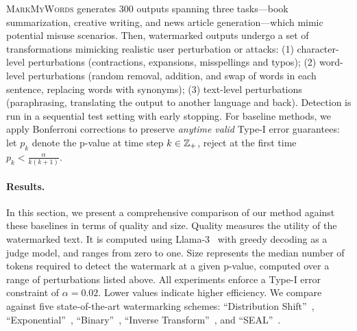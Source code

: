 \textsc{MarkMyWords} generates 300 outputs spanning three tasks---book summarization, creative writing, and news article generation---which mimic potential misuse scenarios. 
Then, watermarked outputs undergo a set of transformations mimicking realistic user perturbation or attacks: (1) character-level perturbations (contractions, expansions, misspellings and typos); (2) word-level perturbations (random removal, addition, and swap of words in each sentence, replacing words with synonyms); (3) text-level perturbations (paraphrasing, translating the output to another language and back).
Detection is run in a sequential test setting with early stopping. For baseline methods, we apply Bonferroni corrections to preserve \emph{anytime valid} Type-I error guarantees: let $p_k$ denote the p-value at time step $k \in \mathbb{Z}_+$, reject at the first time ${p_k} < \frac{\alpha}{k(k+1)}$.

\paragraph{Results.}

In this section, we present a comprehensive comparison of our method against these baselines in terms of quality and size. 
Quality measures the utility of the watermarked text. It is computed using Llama-3~\citep{dubey2024llama} with greedy decoding as a judge model, and ranges from zero to one.
{Size} represents the median number of tokens required to detect the watermark at a given p-value, computed over a range of perturbations listed above. All experiments enforce a Type-I error constraint of $\alpha = 0.02$. Lower values indicate higher efficiency.
We compare against five state-of-the-art watermarking schemes: 
``Distribution Shift''~\citep{kirchenbauer2023watermark}, 
``Exponential''~\citep{aaronson2022watermarking}, 
``Binary''~\citep{christ2023undetectable},
``Inverse Transform''~\citep{kuditipudi2023robust}, and ``SEAL''~\citep{huang2025watermarking}.

